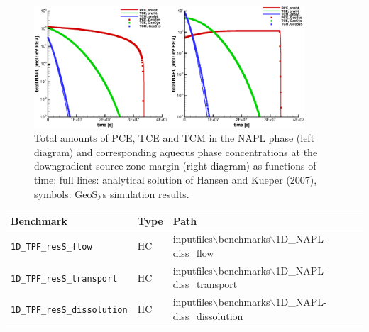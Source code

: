 \begin{figure}[htbp]
\centering
\includegraphics[width=0.9\textwidth]{C/figures/H&K_ASvsGS.eps}
\caption{Total amounts of PCE, TCE and TCM in the NAPL phase (left diagram) and corresponding aqueous phase concentrations at the downgradient source zone margin (right diagram) as functions of time; full lines: analytical solution of Hansen and Kueper (2007), symbols: GeoSys simulation results.}
\label{fig_HKAS_vs_GeoSys}
\end{figure}


\begin{table}[htbp]
\centering
\begin{tabular}{|l|l|l|}
\hline
Benchmark & Type & Path \\
\hline
\texttt{1D\_TPF\_resS\_flow}& HC &  inputfiles$\backslash$benchmarks$\backslash$1D\_NAPL-diss\_flow  \\			
\hline
\texttt{1D\_TPF\_resS\_transport}& HC &  inputfiles$\backslash$benchmarks$\backslash$1D\_NAPL-diss\_transport  \\			 \hline
\texttt{1D\_TPF\_resS\_dissolution}& HC &  inputfiles$\backslash$benchmarks$\backslash$1D\_NAPL-diss\_dissolution \\			 \hline
\end{tabular}
\end{table}
